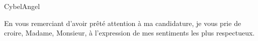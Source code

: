 \documentclass[11pt]{lettre}
\begin{document}
\begin{letter}{CybelAngel}





    
    \closing{En vous remerciant d’avoir prêté attention à ma candidature, je vous prie de croire, Madame, Monsieur, à l’expression de mes sentiments les plus respectueux.}
    
 
\end{letter}
 
\end{document}
